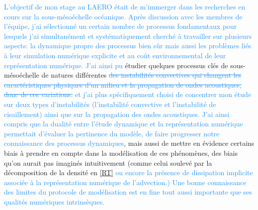 \documentclass{rapportECC}
\newcommand{\FAadd}[1]{\textcolor{DodgerBlue}{{#1}}}                     %
\newcommand{\FAdel}[1]{\textcolor{DodgerBlue}{\sout{#1}}}                %
\begin{document}
\FAadd{L'objectif de mon stage au LAERO était de m'immerger dans les recherches en cours sur la sous-mésoéchelle océanique. Après discussion avec les membres de l'équipe, j'ai sélectionné un certain nombre de processus fondamentaux pour lesquels j'ai simultanément et systématiquement cherché à travailler sur plusieurs aspects: la dynamique propre des processus bien sûr mais aussi les problèmes liés à leur simulation numérique explicite et au coût environnemental de leur représentation numérique. 
J'ai ainsi pu} étudier quelques processus clés de sous-mésoéchelle de natures différentes \FAdel{des instabilités convectives qui changent les caractéristiques physiques d'un milieu et la propagation de ondes acoustiques, donc de ces variations.}  \FAadd{ et j'ai plus spécifiquement choisi de concentrer mon étude sur deux types d'instabilités (l'instabilité convective et l'instabilité de cisaillement) ainsi que sur la propagation des ondes acoustiques. 
J'ai ainsi compris que la dualité entre l'étude dynamique et la représentation numérique permettait d'évaluer la pertinence du modèle, de faire progresser notre connaissance des processus dynamiques}, mais aussi de mettre en évidence certains biais à prendre en compte dans la modélisation de ces phénomènes, des biais qu'on aurait pas imaginés intuitivement (comme celui soulevé par la décomposition de la densité en \ref{RT} \FAadd{ou encore la présence de dissipation implicite associée à la représentation numérique de l'advection.) Une bonne connaissance des limites du protocole de modélisation est en fine tout aussi importante que ses qualités numériques intrinsèques.}
\end{document}
